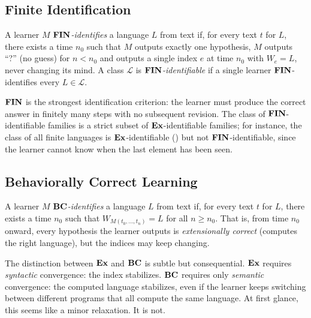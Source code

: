 \subsection{Finite Identification}
\label{sec:fin-learning}

\begin{defn}
\label{def:fin-learning}
A learner $M$ \emph{$\mathbf{FIN}$-identifies} a language $L$ from text if, for every text $t$ for $L$, there exists a time $n_0$ such that $M$ outputs exactly one hypothesis, $M$ outputs ``?'' (no guess) for $n < n_0$ and outputs a single index $e$ at time $n_0$ with $W_e = L$, never changing its mind. A class $\mathcal{L}$ is \emph{$\mathbf{FIN}$-identifiable} if a single learner $\mathbf{FIN}$-identifies every $L \in \mathcal{L}$.
\end{defn}

$\mathbf{FIN}$ is the strongest identification criterion: the learner must produce the correct answer in finitely many steps with no subsequent revision. The class of $\mathbf{FIN}$-identifiable families is a strict subset of $\mathbf{Ex}$-identifiable families; for instance, the class of all finite languages is $\mathbf{Ex}$-identifiable () but not $\mathbf{FIN}$-identifiable, since the learner cannot know when the last element has been seen.

\subsection{Behaviorally Correct Learning}
\label{sec:bc-learning}

\begin{defn}
\label{def:bc-learning}
A learner $M$ \emph{$\mathbf{BC}$-identifies} a language $L$ from text if, for every text $t$ for $L$, there exists a time $n_0$ such that $W_{M(t_0, \ldots, t_n)} = L$ for all $n \geq n_0$. That is, from time $n_0$ onward, every hypothesis the learner outputs is \emph{extensionally correct} (computes the right language), but the indices may keep changing.
\end{defn}

The distinction between $\mathbf{Ex}$ and $\mathbf{BC}$ is subtle but consequential. $\mathbf{Ex}$ requires \emph{syntactic} convergence: the index stabilizes. $\mathbf{BC}$ requires only \emph{semantic} convergence: the computed language stabilizes, even if the learner keeps switching between different programs that all compute the same language. At first glance, this seems like a minor relaxation. It is not.

